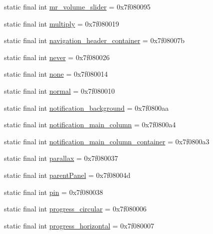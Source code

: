 \begin{CompactItemize}
\item 
static final int \hyperlink{classandroid_1_1support_1_1v7_1_1appcompat_1_1_r_1_1id_baab24baff8d8493bdc6b3ab5f5fff4d}{mr\_\-volume\_\-slider} = 0x7f080095
\item 
static final int \hyperlink{classandroid_1_1support_1_1v7_1_1appcompat_1_1_r_1_1id_2acb604a2c4d688480d41211a45e3cb5}{multiply} = 0x7f080019
\item 
static final int \hyperlink{classandroid_1_1support_1_1v7_1_1appcompat_1_1_r_1_1id_e5a23b1bd8375a1daa111c49e9cb6886}{navigation\_\-header\_\-container} = 0x7f08007b
\item 
static final int \hyperlink{classandroid_1_1support_1_1v7_1_1appcompat_1_1_r_1_1id_27aeed36bce935844d879025feb126f3}{never} = 0x7f080026
\item 
static final int \hyperlink{classandroid_1_1support_1_1v7_1_1appcompat_1_1_r_1_1id_7fd0fd3759be95806178e2003a0cfbba}{none} = 0x7f080014
\item 
static final int \hyperlink{classandroid_1_1support_1_1v7_1_1appcompat_1_1_r_1_1id_efac8d1aeb782c09cb6f33554eb790c3}{normal} = 0x7f080010
\item 
static final int \hyperlink{classandroid_1_1support_1_1v7_1_1appcompat_1_1_r_1_1id_984d0c46e6aad83ddcd276c3ac6671e3}{notification\_\-background} = 0x7f0800aa
\item 
static final int \hyperlink{classandroid_1_1support_1_1v7_1_1appcompat_1_1_r_1_1id_6735df85384430a5c941c877f9923c5b}{notification\_\-main\_\-column} = 0x7f0800a4
\item 
static final int \hyperlink{classandroid_1_1support_1_1v7_1_1appcompat_1_1_r_1_1id_8e23ee636a5c1a92bf275aca52b81f28}{notification\_\-main\_\-column\_\-container} = 0x7f0800a3
\item 
static final int \hyperlink{classandroid_1_1support_1_1v7_1_1appcompat_1_1_r_1_1id_96afcf92d7c276a60efcc977795d55d1}{parallax} = 0x7f080037
\item 
static final int \hyperlink{classandroid_1_1support_1_1v7_1_1appcompat_1_1_r_1_1id_a35ef191868b4400c86f8a88dceffc64}{parentPanel} = 0x7f08004d
\item 
static final int \hyperlink{classandroid_1_1support_1_1v7_1_1appcompat_1_1_r_1_1id_fd4c6b3c14261cf54c5e8ba319a3baf6}{pin} = 0x7f080038
\item 
static final int \hyperlink{classandroid_1_1support_1_1v7_1_1appcompat_1_1_r_1_1id_ab35c0643481f8c93a6a545580150ee8}{progress\_\-circular} = 0x7f080006
\item 
static final int \hyperlink{classandroid_1_1support_1_1v7_1_1appcompat_1_1_r_1_1id_4e9f70dee5cd903101ab337e9defcd62}{progress\_\-horizontal} = 0x7f080007

\end{CompactItemize}
